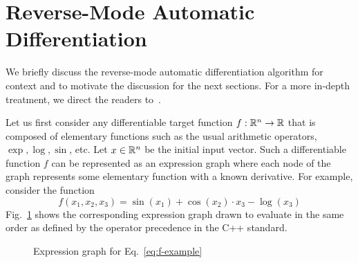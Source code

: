 \section{Reverse-Mode Automatic Differentiation}

We briefly discuss the reverse-mode automatic differentiation algorithm
for context and to motivate the discussion for the next sections.
For a more in-depth treatment, we direct the readers 
to~\cite{carpenter:2015}\cite{margossian:2018}\cite{griewank:2008}.

Let us first consider any differentiable target function $f: \mathbb{R}^n \to \mathbb{R}$
that is composed of elementary functions such as the usual arithmetic operators,
$\exp, \log, \sin$, etc.
Let $x \in \mathbb{R}^n$ be the initial input vector.
Such a differentiable function $f$ can be represented as an expression graph
where each node of the graph represents some elementary function with a known derivative.
For example, consider the function 
\begin{equation}
    f(x_1, x_2, x_3) = \sin(x_1) + \cos(x_2) \cdot x_3 - \log(x_3)
    \label{eq:f-example}
\end{equation}
Fig.~\ref{fig:expr-example} shows the corresponding expression graph
drawn to evaluate in the same order as defined by the operator precedence in the C++ standard.

\begin{figure}[t]
\centering
{}

\caption{Expression graph for Eq.~\ref{eq:f-example}}\label{fig:expr-example}

\end{figure}

